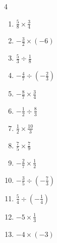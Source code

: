 \begin{multicols}{4}
\begin{enumerate}
  \item $\displaystyle \frac{5}{8}\times{}\frac{3}{4}$


  \item $\displaystyle -\frac{3}{2}\times{}\left(-6\right)$

        \phantom{$\displaystyle =9$}

  \item $\displaystyle \frac{5}{3}\div{}\frac{1}{8}$


\columnbreak %

  \item $\displaystyle -\frac{4}{7}\div{}\left(-\frac{2}{3}\right)$


  \item $\displaystyle -\frac{8}{7}\times{}\frac{3}{4}$


  \item $\displaystyle -\frac{1}{2}\div{}\frac{8}{3}$


  \item $\displaystyle \frac{1}{2}\times{}\frac{10}{3}$


  \item $\displaystyle \frac{7}{5}\times{}\frac{7}{9}$


  \item $\displaystyle -\frac{2}{7}\times{}\frac{1}{2}$


  \item $\displaystyle -\frac{3}{5}\div{}\left(-\frac{7}{3}\right)$


  \item $\displaystyle \frac{5}{4}\div{}\left(-\frac{1}{4}\right)$

        \phantom{$\displaystyle =-5$}

  \item $\displaystyle -5\times{}\frac{1}{3}$


  \item $\displaystyle -4\times{}\left(-3\right)$

        \phantom{$\displaystyle =12$}

\end{enumerate}
\end{multicols}

